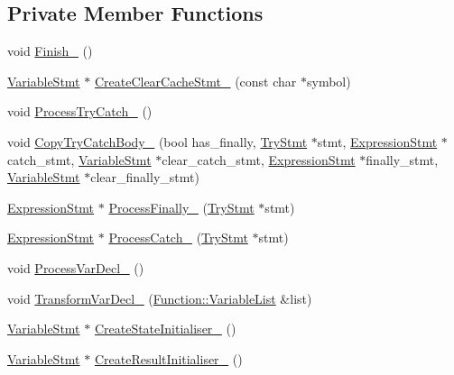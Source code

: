 \subsection*{Private Member Functions}
\begin{DoxyCompactItemize}
\item 
void \hyperlink{classmocha_1_1_yield_helper_aba29acb586a02aa2d84379b6d6b55f81}{Finish\_\-} ()
\item 
\hyperlink{classmocha_1_1_variable_stmt}{VariableStmt} $\ast$ \hyperlink{classmocha_1_1_yield_helper_acc7e323e9d05d15a089f8b76c1733454}{CreateClearCacheStmt\_\-} (const char $\ast$symbol)
\item 
void \hyperlink{classmocha_1_1_yield_helper_ae9abd35221d6fdf1af067bcf07d73836}{ProcessTryCatch\_\-} ()
\item 
void \hyperlink{classmocha_1_1_yield_helper_a51dd2a9d4ed92c5106157ac3fe4f2dd6}{CopyTryCatchBody\_\-} (bool has\_\-finally, \hyperlink{classmocha_1_1_try_stmt}{TryStmt} $\ast$stmt, \hyperlink{classmocha_1_1_expression_stmt}{ExpressionStmt} $\ast$catch\_\-stmt, \hyperlink{classmocha_1_1_variable_stmt}{VariableStmt} $\ast$clear\_\-catch\_\-stmt, \hyperlink{classmocha_1_1_expression_stmt}{ExpressionStmt} $\ast$finally\_\-stmt, \hyperlink{classmocha_1_1_variable_stmt}{VariableStmt} $\ast$clear\_\-finally\_\-stmt)
\item 
\hyperlink{classmocha_1_1_expression_stmt}{ExpressionStmt} $\ast$ \hyperlink{classmocha_1_1_yield_helper_af168a5d5e7c229f400dac5be45f47c7a}{ProcessFinally\_\-} (\hyperlink{classmocha_1_1_try_stmt}{TryStmt} $\ast$stmt)
\item 
\hyperlink{classmocha_1_1_expression_stmt}{ExpressionStmt} $\ast$ \hyperlink{classmocha_1_1_yield_helper_a9197f5ed9b16b44e30817563a9e4d5d4}{ProcessCatch\_\-} (\hyperlink{classmocha_1_1_try_stmt}{TryStmt} $\ast$stmt)
\item 
void \hyperlink{classmocha_1_1_yield_helper_a39560befc3e08ac0184f5dbbd4ea5f6c}{ProcessVarDecl\_\-} ()
\item 
void \hyperlink{classmocha_1_1_yield_helper_a7f4568bb3f2a277cfadd54240b661ab3}{TransformVarDecl\_\-} (\hyperlink{classmocha_1_1_function_a243702678d29f0cfd91913838c1fb38c}{Function::VariableList} \&list)
\item 
\hyperlink{classmocha_1_1_variable_stmt}{VariableStmt} $\ast$ \hyperlink{classmocha_1_1_yield_helper_a4469a46dcc10ce24f6b0ef5cfc1e6092}{CreateStateInitialiser\_\-} ()
\item 
\hyperlink{classmocha_1_1_variable_stmt}{VariableStmt} $\ast$ \hyperlink{classmocha_1_1_yield_helper_a30b6aec46dfdd328096a9e5886d6bed4}{CreateResultInitialiser\_\-} ()

\end{DoxyCompactItemize}
